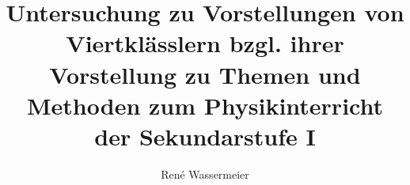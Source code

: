 

\title{
Untersuchung zu Vorstellungen von Viertklässlern bzgl. ihrer Vorstellung zu Themen und Methoden zum Physikinterricht der Sekundarstufe I
}

\author{
René Wassermeier
}



%
%


	
	
	\onehalfspacing	%





	
	
	\versicherung %

	


